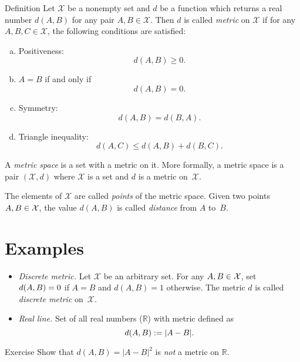 \begin{thm}{Definition}\label{def:metric-space}
Let $\mathcal X$ be a nonempty set and 
$d$ be a function
which returns a real number $d(A,B)$
for any pair $A,B\in\mathcal X$.
Then $d$
is called \emph{metric} on 
$\mathcal X$ if for any
$A,B,C\in \mathcal X$, the following conditions are satisfied:
\begin{enumerate}[(a)]
\item\label{def:metric-space:a} Positiveness: 
$$d(A,B)\ge 0.$$
\item\label{def:metric-space:b} $A=B$ if and only if 
$$d(A,B)=0.$$
\item\label{def:metric-space:c} Symmetry: $$d(A, B) = d(B, A).$$
\item\label{def:metric-space:d} Triangle inequality: 
$$d(A, C) \le d(A, B) + d(B, C).$$
\end{enumerate}
A \emph{metric space} is a set with a metric on it. 
More formally, a metric space is a pair $(\mathcal X, d)$ where $\mathcal X$ is a set and $d$ is a metric on~$\mathcal X$.

The elements of $\mathcal X$ are called \emph{points} of the metric space.
Given two points $A,B\z\in \mathcal X$, 
the value $d(A, B)$ is called \emph{distance} from $A$ to~$B$.
\end{thm}

\section*{Examples}

\begin{itemize}
\item {}\emph{Discrete metric.} Let $\mathcal X$ be an arbitrary set. 
For any $A,B\z\in\mathcal X$, 
set $d(A,B)\z=0$ if $A=B$ and $d(A,B)=1$ otherwise.
The metric $d$ is called \emph{discrete metric} on~$\mathcal X$.
\item{}\emph{Real line.} Set of all real numbers ($\mathbb{R}$) with metric defined as 
$$d(A,B):=|A-B|.$$
\end{itemize}

\begin{thm}{Exercise}\label{ex:dist-square}
Show that $d(A,B)=|A-B|^2$ is {}\emph{not} a metric on $\mathbb{R}$.
\end{thm}

